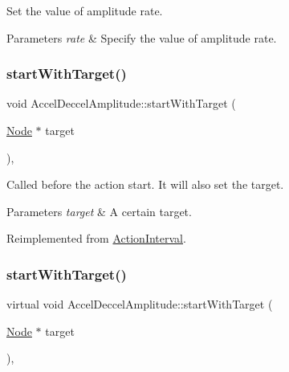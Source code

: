 Set the value of amplitude rate. 


\begin{DoxyParams}{Parameters}
{\em rate} & Specify the value of amplitude rate. \\
\hline
\end{DoxyParams}
\mbox{\label{classAccelDeccelAmplitude_a1ceadaa1a00e4d4c360b0154fa7687ef}} 
\subsubsection{\texorpdfstring{start\+With\+Target()}{startWithTarget()}\hspace{0.1cm}{\footnotesize\ttfamily [1/2]}}
{\footnotesize\ttfamily void Accel\+Deccel\+Amplitude\+::start\+With\+Target (\begin{DoxyParamCaption}\item[{\hyperlink{classNode}{Node} $\ast$}]{target }\end{DoxyParamCaption})\hspace{0.3cm}{\ttfamily [override]}, {\ttfamily [virtual]}}

Called before the action start. It will also set the target.


\begin{DoxyParams}{Parameters}
{\em target} & A certain target. \\
\hline
\end{DoxyParams}


Reimplemented from \hyperlink{classActionInterval_ad3d91186b2c3108488ddbbdbbd982484}{Action\+Interval}.

\mbox{\label{classAccelDeccelAmplitude_ac81fd0ae7ecaae2076e9e4d912392204}} 
\subsubsection{\texorpdfstring{start\+With\+Target()}{startWithTarget()}\hspace{0.1cm}{\footnotesize\ttfamily [2/2]}}
{\footnotesize\ttfamily virtual void Accel\+Deccel\+Amplitude\+::start\+With\+Target (\begin{DoxyParamCaption}\item[{\hyperlink{classNode}{Node} $\ast$}]{target }\end{DoxyParamCaption})\hspace{0.3cm}{\ttfamily [override]}, {\ttfamily [virtual]}}

